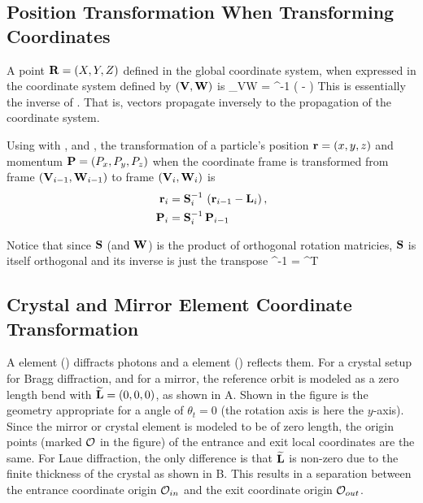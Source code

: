\subsection{Position Transformation When Transforming Coordinates}
\label{s:pos.trans}

A point ${\bf R} = (X, Y, Z)$ defined in the global coordinate system,
when expressed in the coordinate system defined by $({\bf V}, {\bf W})$ is
\Begineq
  \bfR_{VW} = \bfW^{-1} \left( \bfR - \bfV \right)
  \label{rwrv}
\Endeq
This is essentially the inverse of . That is, vectors
propagate inversely to the propagation of the coordinate system.

Using  with , and , the transformation of a
particle's position ${\bf r} = (x,y,z)$ and momentum ${\bf P} = (P_x, P_y,
P_z)$ when the coordinate frame is transformed from frame
$({\bf V}_{i-1}, {\bf W}_{i-1})$ to frame $({\bf V}_i, {\bf W}_i)$ is
\begin{align}
  {\bf r}_i &= {\bf S}_i^{-1} \, \left( {\bf r}_{i-1} - {\bf L}_i \right), 
    \label{rwlr} \\
  {\bf P}_i &= {\bf S}_i^{-1} \, {\bf P}_{i-1}
    \label{pps}
\end{align}

Notice that since ${\bf S}$ (and ${\bf W}$) is the product of orthogonal
rotation matricies, ${\bf S}$ is itself orthogonal and its inverse is
just the transpose
\Begineq
  \bfS^{-1} = \bfS^T
\Endeq

\subsection{Crystal and Mirror Element Coordinate Transformation}
\label{s:mirror.coords}

A  element () diffracts photons and a
 element () reflects them. For a crystal
setup for Bragg diffraction, and for a mirror, the reference orbit is
modeled as a zero length bend with ${\widetilde{\bf L}} = (0, 0, 0)$, as shown
in A. Shown in the figure is the geometry
appropriate for a  angle of $\theta_t = 0$ (the rotation axis is
here the $y$-axis). Since the mirror or crystal element is modeled to
be of zero length, the origin points (marked ${\cal O}$ in the figure)
of the entrance and exit local coordinates are the same. For Laue
diffraction, the only difference is that ${\widetilde{\bf L}}$ is non-zero due
to the finite thickness of the crystal as shown in
B. This results in a separation between the
entrance coordinate origin ${\cal O}_{in}$ and the exit coordinate
origin ${\cal O}_{out}$.

